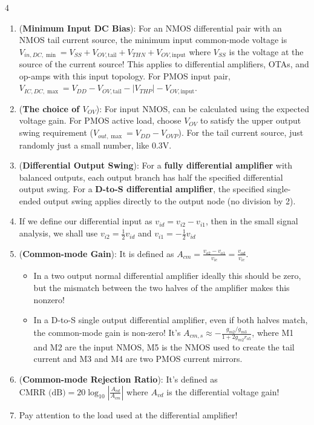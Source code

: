 \documentclass[10pt, landscape]{article}
\begin{document}
\begin{multicols}{4}
\begin{enumerate}
    \item (\textbf{Minimum Input DC Bias}): For an NMOS differential pair with an NMOS tail current source, the minimum input common-mode voltage is $V_{in,DC,\min}=V_{SS}+V_{OV,\text{tail}}+V_{THN}+V_{OV,\text{input}}$ where $V_{SS}$ is the voltage at the source of the current source! This applies to differential amplifiers, OTAs, and op-amps with this input topology. For PMOS input pair, $V_{IC,DC,\max}=V_{DD}-V_{OV,\text{tail}}-|V_{THP}|-V_{OV,\text{input}}$.
    \item (\textbf{The choice of $V_{OV}$}): For input NMOS, can be calculated using the expected voltage gain. For PMOS active load, choose $V_{OV}$ to satisfy the upper output swing requirement ($V_{out,\max}=V_{DD}-V_{OVP}$). For the tail current source, just randomly just a small number, like 0.3V.
    \item (\textbf{Differential Output Swing}): For a \textbf{fully differential amplifier} with balanced outputs, each output branch has half the specified differential output swing. For a \textbf{D-to-S differential amplifier}, the specified single-ended output swing applies directly to the output node (no division by 2).
    \item If we define our differential input as $v_{id}=v_{i2}-v_{i1}$, then in the small signal analysis, we shall use $v_{i2}=\frac12v_{id}$ and $v_{i1}=-\frac12v_{id}$
    \item (\textbf{Common-mode Gain}): It is defined as $A_{cm}=\frac{v_{o2}-v_{o1}}{v_{ic}}=\frac{v_{od}}{v_{ic}}$.
    \begin{itemize}
        \item In a two output normal differential amplifier ideally this should be zero, but the mismatch between the two halves of the amplifier makes this nonzero!
        \item In a D-to-S single output differential amplifier, even if both halves match, the common-mode gain is non-zero! It's $A_{cm,s}\approx-\frac{g_{m2}/g_{m3}}{1+2g_{m2}r_{o5}}$, where M1 and M2 are the input NMOS, M5 is the NMOS used to create the tail current and M3 and M4 are two PMOS current mirrors.
    \end{itemize}
    \item (\textbf{Common-mode Rejection Ratio}): It's defined as $\text{CMRR (dB)}=20\log_{10}\left|\frac{A_{vd}}{A_{cm}}\right|$ where $A_{vd}$ is the differential voltage gain!
    \item Pay attention to the load used at the differential amplifier!
\end{enumerate}


\end{multicols}
\end{document}

